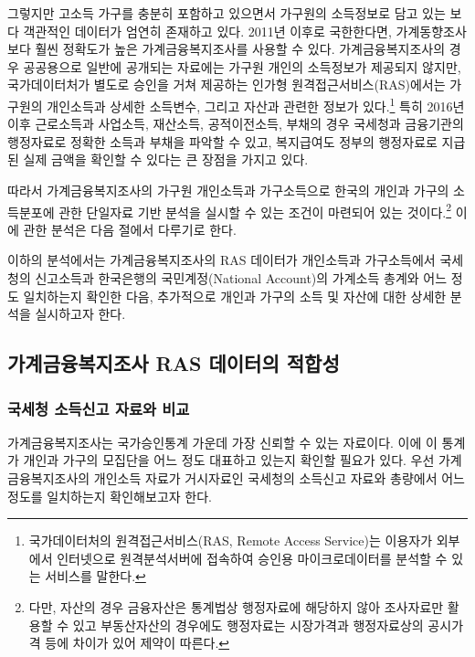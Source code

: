 \documentclass[
  letterpaper,
  DIV=11,
  numbers=noendperiod]{scrartcl}
\begin{document}
그렇지만 고소득 가구를 충분히 포함하고 있으면서 가구원의 소득정보로 담고
있는 보다 객관적인 데이터가 엄연히 존재하고 있다. 2011년 이후로
국한한다면, 가계동향조사보다 훨씬 정확도가 높은 가계금융복지조사를
사용할 수 있다. 가계금융복지조사의 경우 공공용으로 일반에 공개되는
자료에는 가구원 개인의 소득정보가 제공되지 않지만, 국가데이터처가 별도로
승인을 거쳐 제공하는 인가형 원격접근서비스(RAS)에서는 가구원의
개인소득과 상세한 소득변수, 그리고 자산과 관련한 정보가 있다.\footnote{국가데이터처의
  원격접근서비스(RAS, Remote Access Service)는 이용자가 외부에서
  인터넷으로 원격분석서버에 접속하여 승인용 마이크로데이터를 분석할 수
  있는 서비스를 말한다.} 특히 2016년 이후 근로소득과 사업소득, 재산소득,
공적이전소득, 부채의 경우 국세청과 금융기관의 행정자료로 정확한 소득과
부채을 파악할 수 있고, 복지급여도 정부의 행정자료로 지급된 실제 금액을
확인할 수 있다는 큰 장점을 가지고 있다.

따라서 가계금융복지조사의 가구원 개인소득과 가구소득으로 한국의 개인과
가구의 소득분포에 관한 단일자료 기반 분석을 실시할 수 있는 조건이
마련되어 있는 것이다.\footnote{다만, 자산의 경우 금융자산은 통계법상
  행정자료에 해당하지 않아 조사자료만 활용할 수 있고 부동산자산의
  경우에도 행정자료는 시장가격과 행정자료상의 공시가격 등에 차이가 있어
  제약이 따른다.} 이에 관한 분석은 다음 절에서 다루기로 한다.

이하의 분석에서는 가계금융복지조사의 RAS 데이터가 개인소득과
가구소득에서 국세청의 신고소득과 한국은행의 국민계정(National Account)의
가계소득 총계와 어느 정도 일치하는지 확인한 다음, 추가적으로 개인과
가구의 소득 및 자산에 대한 상세한 분석을 실시하고자 한다.

\subsection{가계금융복지조사 RAS 데이터의
적합성}\label{uxac00uxacc4uxae08uxc735uxbcf5uxc9c0uxc870uxc0ac-ras-uxb370uxc774uxd130uxc758-uxc801uxd569uxc131}

\subsubsection{국세청 소득신고 자료와
비교}\label{uxad6duxc138uxccad-uxc18cuxb4dduxc2e0uxace0-uxc790uxb8ccuxc640-uxbe44uxad50}

가계금융복지조사는 국가승인통계 가운데 가장 신뢰할 수 있는 자료이다.
이에 이 통계가 개인과 가구의 모집단을 어느 정도 대표하고 있는지 확인할
필요가 있다. 우선 가계금융복지조사의 개인소득 자료가 거시자료인 국세청의
소득신고 자료와 총량에서 어느 정도를 일치하는지 확인해보고자 한다.
\end{document}
